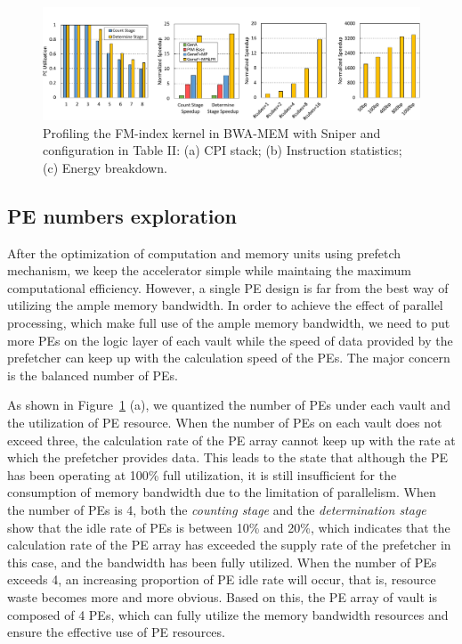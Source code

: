 \documentclass[9pt,conference]{IEEEtran}
\begin{document}
\begin{figure}[!t]
\centering
\includegraphics[scale=0.55]{Conference-LaTeX-template_10-17-19/fig/result.pdf}
\caption{Profiling the FM-index kernel in BWA-MEM with Sniper and configuration in Table II: (a) CPI stack; (b) Instruction statistics; (c) Energy breakdown.}
\label{fig:result}
\end{figure}

\subsection{PE numbers exploration}
\label{sec:arch:pe_number}
After the optimization of computation and memory units using prefetch mechanism, we keep the accelerator simple while maintaing the maximum computational efficiency. However, a single PE design is far from the best way of utilizing the ample memory bandwidth. In order to achieve the effect of parallel processing, which make full use of the ample memory bandwidth, we need to put more PEs on the logic layer of each vault while the speed of data provided by the prefetcher can keep up with the calculation speed of the PEs. The major concern is the balanced number of PEs. 

As shown in Figure~\ref{fig:result} (a), we quantized the number of PEs under each vault and the utilization of PE resource. When the number of PEs on each vault does not exceed three, the calculation rate of the PE array cannot keep up with the rate at which the prefetcher provides data. This leads to the state that although the PE has been operating at 100\% full utilization, it is still insufficient for the consumption of memory bandwidth due to the limitation of parallelism. When the number of PEs is 4, both the \textit{counting stage} and the \textit{determination stage} show that the idle rate of PEs is between 10\% and 20\%, which indicates that the calculation rate of the PE array has exceeded the supply rate of the prefetcher in this case, and the bandwidth has been fully utilized. When the number of PEs exceeds 4, an increasing proportion of PE idle rate will occur, that is, resource waste becomes more and more obvious. Based on this, the PE array of vault is composed of 4 PEs, which can fully utilize the memory bandwidth resources and ensure the effective use of PE resources.
\end{document}
